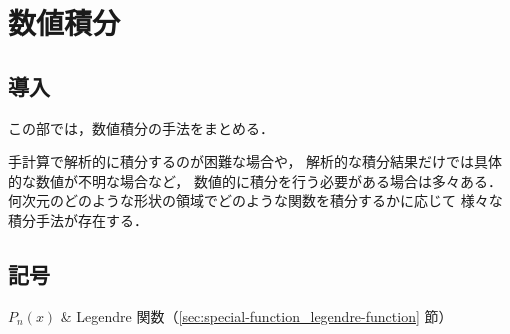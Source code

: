 %

\part{数値積分}

\chapter{導入}

この部では，数値積分の手法をまとめる．

手計算で解析的に積分するのが困難な場合や，
解析的な積分結果だけでは具体的な数値が不明な場合など，
数値的に積分を行う必要がある場合は多々ある．
何次元のどのような形状の領域でどのような関数を積分するかに応じて
様々な積分手法が存在する．

\chapter{記号}

\begin{explainlist}
    $P_n(x)$ & Legendre 関数（\ref{sec:special-function_legendre-function} 節） \\
\end{explainlist}


